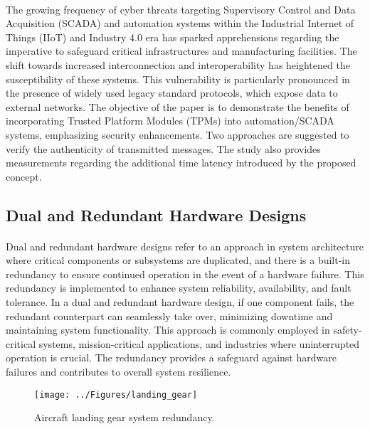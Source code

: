 \paragraph*{}
The growing frequency of cyber threats targeting Supervisory Control and Data Acquisition (SCADA) and automation systems within the Industrial Internet of Things (IIoT) and Industry 4.0 era has sparked apprehensions regarding the imperative to safeguard critical infrastructures and manufacturing facilities. The shift towards increased interconnection and interoperability has heightened the susceptibility of these systems. This vulnerability is particularly pronounced in the presence of widely used legacy standard protocols, which expose data to external networks. The objective of the paper \cite{s19194191} is to demonstrate the benefits of incorporating Trusted Platform Modules (TPMs) into automation/SCADA systems, emphasizing security enhancements. Two approaches are suggested to verify the authenticity of transmitted messages. The study also provides measurements regarding the additional time latency introduced by the proposed concept.
\subsection{Dual and Redundant Hardware Designs}
\paragraph*{}
Dual and redundant hardware designs refer to an approach in system architecture where critical components or subsystems are duplicated, and there is a built-in redundancy to ensure continued operation in the event of a hardware failure. This redundancy is implemented to enhance system reliability, availability, and fault tolerance. In a dual and redundant hardware design, if one component fails, the redundant counterpart can seamlessly take over, minimizing downtime and maintaining system functionality. This approach is commonly employed in safety-critical systems, mission-critical applications, and industries where uninterrupted operation is crucial. The redundancy provides a safeguard against hardware failures and contributes to overall system resilience.
\begin{figure}[h]
	\centering
	\texttt{[image: ../Figures/landing\_gear]}
	\caption{Aircraft landing gear system redundancy.}
	\label{fig:landinggear}
\end{figure}
\pagebreak
